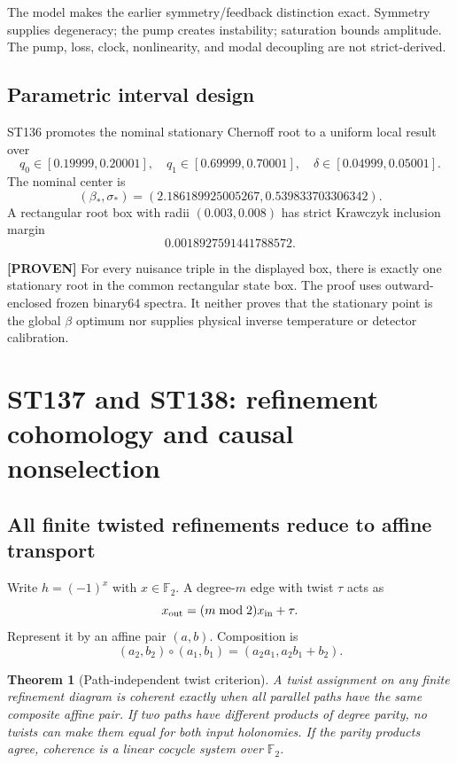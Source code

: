\documentclass[11pt,a4paper]{article}
\newtheorem{theorem}{Theorem}[section]
\newcommand{\proven}{\textcolor{green!40!black}{\textbf{[PROVEN]}}}
\begin{document}
The model makes the earlier symmetry/feedback distinction exact. Symmetry supplies degeneracy; the pump creates instability; saturation bounds amplitude. The pump, loss, clock, nonlinearity, and modal decoupling are not strict-derived.

\subsection{Parametric interval design}

ST136 promotes the nominal stationary Chernoff root to a uniform local result over
\[
q_0\in[0.19999,0.20001],\quad q_1\in[0.69999,0.70001],\quad
\delta\in[0.04999,0.05001].
\]
The nominal center is
\[
(\beta_*,\sigma_*)=(2.186189925005267,0.539833703306342).
\]
A rectangular root box with radii $(0.003,0.008)$ has strict Krawczyk inclusion margin
\[
0.0018927591441788572.
\]

\proven{} For every nuisance triple in the displayed box, there is exactly one stationary root in the common rectangular state box. The proof uses outward-enclosed frozen binary64 spectra. It neither proves that the stationary point is the global $\beta$ optimum nor supplies physical inverse temperature or detector calibration.

\section{ST137 and ST138: refinement cohomology and causal nonselection}

\subsection{All finite twisted refinements reduce to affine transport}

Write $h=(-1)^x$ with $x\in\mathbb F_2$. A degree-$m$ edge with twist $\tau$ acts as
\[
x_{\rm out}=(m\bmod2)x_{\rm in}+\tau.
\]
Represent it by an affine pair $(a,b)$. Composition is
\[
(a_2,b_2)\circ(a_1,b_1)=(a_2a_1,a_2b_1+b_2).
\]

\begin{theorem}[Path-independent twist criterion]
A twist assignment on any finite refinement diagram is coherent exactly when all parallel paths have the same composite affine pair. If two paths have different products of degree parity, no twists can make them equal for both input holonomies. If the parity products agree, coherence is a linear cocycle system over $\mathbb F_2$.
\end{theorem}
\end{document}
